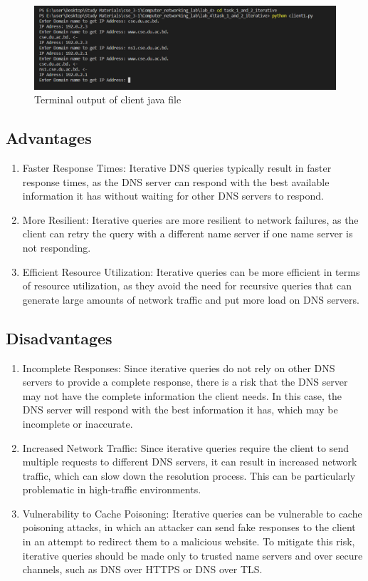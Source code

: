 \documentclass[11pt]{article}
\begin{document}
  \begin{figure}[!h]
\centering
\includegraphics[width=\textwidth]{client2.png}
\caption{Terminal output of client java file }
\end{figure}
\FloatBarrier

\subsection{Advantages}
\begin{enumerate}
\item Faster Response Times: Iterative DNS queries typically result in faster response times, as the DNS server can respond with the best available information it has without waiting for other DNS servers to respond.
\item More Resilient: Iterative queries are more resilient to network failures, as the client can retry the query with a different name server if one name server is not responding.
\item Efficient Resource Utilization: Iterative queries can be more efficient in terms of resource utilization, as they avoid the need for recursive queries that can generate large amounts of network traffic and put more load on DNS servers.
\end{enumerate}


\subsection{Disadvantages}
\begin{enumerate}
\item Incomplete Responses: Since iterative queries do not rely on other DNS servers to provide a complete response, there is a risk that the DNS server may not have the complete information the client needs. In this case, the DNS server will respond with the best information it has, which may be incomplete or inaccurate.
\item Increased Network Traffic: Since iterative queries require the client to send multiple requests to different DNS servers, it can result in increased network traffic, which can slow down the resolution process. This can be particularly problematic in high-traffic environments.
\item Vulnerability to Cache Poisoning: Iterative queries can be vulnerable to cache poisoning attacks, in which an attacker can send fake responses to the client in an attempt to redirect them to a malicious website. To mitigate this risk, iterative queries should be made only to trusted name servers and over secure channels, such as DNS over HTTPS or DNS over TLS.
\end{enumerate}
\end{document}
